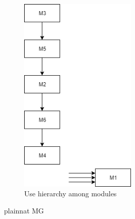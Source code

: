 \documentclass[12pt, titlepage]{article}
\begin{document}
\begin{figure}[H]
\centering
\includegraphics[width=0.5\textwidth]{UsesHierarchy.png}
\caption{Use hierarchy among modules}
\label{FigUH}
\end{figure}


 {plainnat}
 {MG}
\end{document}
